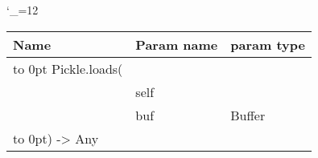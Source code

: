 \begingroup \catcode`\_=12 \tt
\begin{tabular}{lll}
\toprule
\textrm{Name}&\textrm{Param name}&\textrm{param type}\\
\midrule
\hbox to 0pt {Pickle.loads(\hss}\\
& self\\
& buf & Buffer\\
\hbox to 0pt{) -> Any\hss}\\
\bottomrule
\end{tabular}
\endgroup
